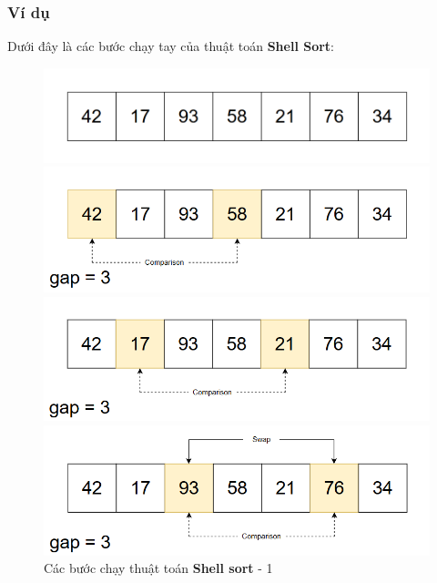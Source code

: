 \subsubsection{Ví dụ}
Dưới đây là các bước chạy tay của thuật toán \textbf{Shell Sort}:
\begin{figure}[H]
    \centering
    \includegraphics[width=1\linewidth]{img/shell_sort/1.png}
    \vspace{0.15cm}

    \includegraphics[width=1\linewidth]{img/shell_sort/2.png}
    \vspace{0.15cm}

    \includegraphics[width=1\linewidth]{img/shell_sort/3.png}
    \vspace{0.15cm}

    \includegraphics[width=1\linewidth]{img/shell_sort/4.png}
    \caption{Các bước chạy thuật toán \textbf{Shell sort} - 1}
\end{figure}

